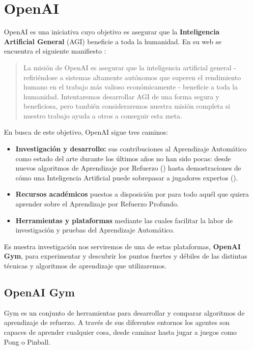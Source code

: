 \section{OpenAI}

OpenAI es una iniciativa cuyo objetivo es asegurar que la \textbf{Inteligencia Artificial General} (AGI) beneficie a toda la humanidad. En su web se encuentra el siguiente manifiesto \citep{OpenAI_charter}:

\begin{quote}
    La misión de OpenAI es asegurar que la inteligencia artificial general - refiriéndose a sistemas altamente autónomos que superen el rendimiento humano en el trabajo más valioso económicamente - beneficie a toda la humanidad. Intentaremos desarrollar AGI de una forma segura y beneficiosa, pero también consideraremos nuestra misión completa si nuestro trabajo ayuda a otros a conseguir esta meta. 
\end{quote}

En busca de este objetivo, OpenAI sigue tres caminos:
\begin{itemize}
    \item \textbf{Investigación y desarrollo:} sus contribuciones al Aprendizaje Automático como estado del arte durante los últimos años no han sido pocas: desde nuevos algoritmos de Aprendizaje por Refuerzo (\citet{baselines}) hasta demostraciones de cómo una Inteligencia Artificial puede sobrepasar a jugadores expertos (\citet{OpenAI_dota}).
    \item \textbf{Recursos académicos} puestos a disposición por \citet{spinningup} para todo aquél que quiera aprender sobre el Aprendizaje por Refuerzo Profundo.
    \item \textbf{Herramientas y plataformas} mediante las cuales facilitar la labor de investigación y pruebas del Aprendizaje Automático.
\end{itemize}

Es nuestra investigación nos serviremos de una de estas plataformas, \textbf{OpenAI Gym}, para experimentar y descubrir los puntos fuertes y débiles de las distintas técnicas y algoritmos de aprendizaje que utilizaremos.


\subsection{OpenAI Gym}
\label{sec:openai}

Gym es un conjunto de herramientas para desarrollar y comparar algoritmos de aprendizaje de refuerzo. A través de sus diferentes entornos los agentes son capaces de aprender cualquier cosa, desde caminar hasta jugar a juegos como Pong o Pinball.

